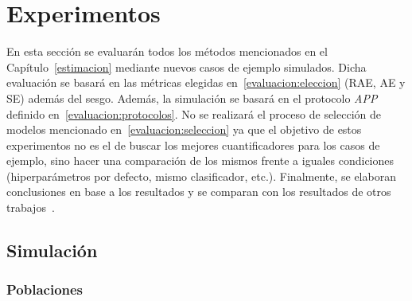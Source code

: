 \chapter{Experimentos}\label{experimentos}

En esta sección se evaluarán todos los métodos mencionados en el
Capítulo~\ref{estimacion} mediante nuevos casos de ejemplo simulados. Dicha
evaluación se basará en las métricas elegidas en~\ref{evaluacion:eleccion} (RAE,
AE y SE) además del sesgo. Además, la simulación se basará en el protocolo {\it
APP\/} definido en~\ref{evaluacion:protocolos}. No se realizará el proceso de
selección de modelos mencionado en~\ref{evaluacion:seleccion} ya que el objetivo
de estos experimentos no es el de buscar los mejores cuantificadores para los
casos de ejemplo, sino hacer una comparación de los mismos frente a iguales
condiciones (hiperparámetros por defecto, mismo clasificador, etc.). Finalmente,
se elaboran conclusiones en base a los resultados y se comparan con los
resultados de otros trabajos~\cite{moreo2021re, moreo2022tweet, moreo2021quapy,
tasche2016does, schumacher2021comparative}.

\section{Simulación}\label{experimentos:simulacion}

\subsection{Poblaciones}\label{experimentos:poblaciones}

